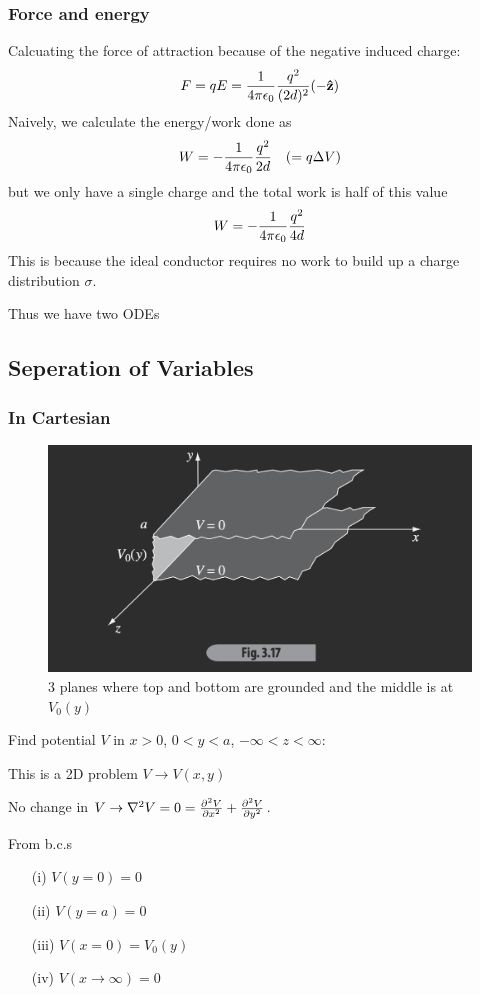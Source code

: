 \documentclass[../main.tex]{subfiles}
\begin{document}
\subsubsection{Force and energy}

Calcuating the force of attraction because of the negative induced charge:
\begin{align*}
    F = qE = \frac{1}{4\pi\epsilon_0} \frac{q^2}{(2d)^2} (-\vu z)
\end{align*}
Naively, we calculate the energy/work done as
\begin{align*}
    W = -\frac{1}{4\pi\epsilon_0} \frac{q^2}{2d} \quad (=q \Delta V)
\end{align*}
but we only have a single charge and the total work is half of this value
\begin{align*}
    W = -\frac{1}{4\pi\epsilon_0} \frac{q^2}{4d}
\end{align*}
This is because the ideal conductor requires no work to build up a charge distribution $\sigma$.

\newpage
{}
Thus we have two ODEs
\subsection{Seperation of Variables}

\subsubsection{In Cartesian}
\begin{figure}[ht]
    \centering
    \includegraphics[width=0.5\linewidth]{fig3_17.png}
    \caption{3 planes where top and bottom are grounded and the middle is at $V_0(y)$}
    \label{fig:lecture3_17}
\end{figure}

Find potential $V$ in $x > 0$, $0< y < a$, $-\infty < z < \infty$:

This is a 2D problem $V\to V(x,y)$

No change in $V \to \laplacian V = 0 = \pdv[2]{V}{x} + \pdv[2]{V}{y}$. 

From b.c.s
\begin{enumerate}
    \item [(i)] $V(y=0) = 0$
    \item [(ii)] $V(y=a) = 0$
    \item [(iii)] $V(x=0) = V_0(y)$
    \item [(iv)] $V(x\to\infty) = 0$
\end{enumerate}
\end{document}
